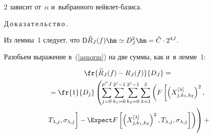 \begin{multicols}{2}
{зависит от~$\alpha$ и~выбранного вейв\-лет-ба\-зиса}.





\smallskip





\noindent


Д\,о\,к\,а\,з\,а\,т\,е\,л\,ь\,с\,т\,в\,о\,.\ \


Из леммы~1 следует, что $\Variance \widehat{R}_J(f)\hm\simeq D_J^2


\hm = \tilde{C}\cdot 2^{4J}$.


Разобьем выражение в~(\ref{asnorm}) на две суммы, как и~в лемме~1:








\noindent


\begin{multline*}


\fr{\widehat{R}_J(f) - R_J(f)}{ D_J } ={}\\


{}=\fr{1}{D_j}\left(


\sum\limits_{j = 0}^{p''J}\sum\limits_{k_1 = 0}^{2^j - 1}


\sum\limits_{k_2 = 0}^{2^j - 1}\sum\limits_{\lambda = 1}^{3}


\left(F\left[\left(X_{j,k_1,k_2}^{[\lambda]}\right)^2,\right.\right.\right.


\\


\left.\left.\left.T_{\lambda,j},


\sigma_{\lambda,j}


\vphantom{\left(X_{j,k_1,k_2}^{[\lambda]}\right)^2}


\right] -


\Expect F\left[\left(X_{j,k_1,k_2}^{[\lambda]}\right)^2,T_{\lambda,j},\sigma_{\lambda,j}


\right]


\right)\!


\vphantom{\sum\limits_{j = 0}^{p''J}\sum\limits_{k_1 = 0}^{2^j - 1}}


\right) +{}


\end{multline*}





\noindent


\begin{multline*}



\end{multline*}
\end{multicols}

